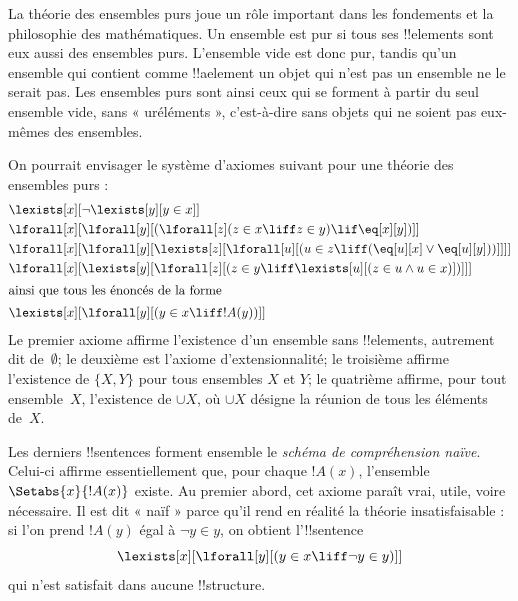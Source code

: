 \documentclass[../../../include/open-logic-section]{subfiles}
\begin{document}
\begin{ex}
La théorie des ensembles purs joue un rôle important dans les
fondements et la philosophie des mathématiques. Un ensemble est pur
si tous ses !!{element}s sont eux aussi des ensembles purs.
L'ensemble vide est donc pur, tandis qu'un ensemble qui contient
comme !!a{element} un objet qui n'est pas un ensemble ne le serait
pas. Les ensembles purs sont ainsi ceux qui se forment à partir du
seul ensemble vide, sans « uréléments », c'est-à-dire sans objets
qui ne soient pas eux-mêmes des ensembles.

On pourrait envisager le système d'axiomes suivant pour une théorie
des ensembles purs :
\begin{align*}
& \lexists[x][\lnot \lexists[y][y \in x]]\\
& \lforall[x][\lforall[y][(\lforall[z](z \in x \liff z \in y) \lif 
\eq[x][y])]]\\
& \lforall[x][\lforall[y][\lexists[z][\lforall[u][(u \in z \liff
(\eq[u][x] \lor \eq[u][y]))]]]]\\
& \lforall[x][\lexists[y][\lforall[z][(z \in y \liff \lexists[u][(z \in
        u \land u \in x)])]]]\\
\intertext{ainsi que tous les énoncés de la forme} &
\lexists[x][\lforall[y][(y \in x \liff !A(y))]]
\end{align*}
Le premier axiome affirme l'existence d'un ensemble sans
!!{element}s, autrement dit de~$\emptyset$; le deuxième est
l'axiome d'extensionnalité; le troisième affirme l'existence de
$\{X, Y\}$ pour tous ensembles $X$ et $Y$; le quatrième affirme,
pour tout ensemble~$X$, l'existence de $\cup X$, où $\cup X$
désigne la réunion de tous les éléments de~$X$.

Les derniers !!{sentence}s forment ensemble le \emph{schéma de
compréhension naïve}. Celui-ci affirme essentiellement que, pour
chaque $!A(x)$, l'ensemble $\Setabs{x}{!A(x)}$ existe. Au premier
abord, cet axiome paraît vrai, utile, voire nécessaire. Il est dit
« naïf » parce qu'il rend en réalité la théorie insatisfaisable :
si l'on prend $!A(y)$ égal à $\lnot y \in y$, on obtient
l'!!{sentence}
\[
\lexists[x][\lforall[y][(y \in x \liff \lnot y \in y)]]
\]
qui n'est satisfait dans aucune !!{structure}.
\end{ex}
\end{document}

